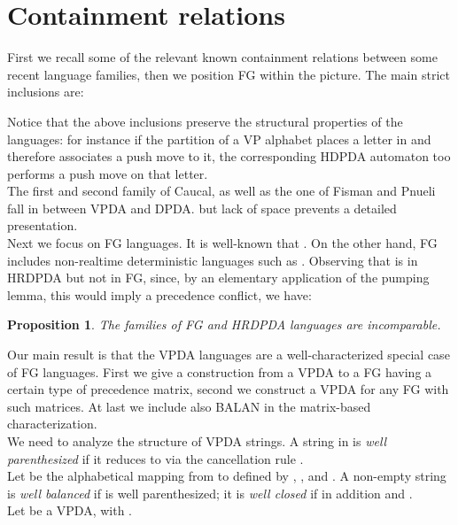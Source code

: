 \documentclass[3p,11pt]{elsarticle}
\newtheorem{proposition}[theorem]{Proposition}
\begin{document}
\section{Containment relations}
First we recall some of the relevant known \cite{AluMad04,conf/mfcs/NowotkaS07,conf/csr/LimayeMM08,caucal:DSP:2008:1743} containment relations between some recent language families, then we position FG within the picture. The main  strict inclusions are:
\begin{center}

\end{center}
Notice that the above inclusions preserve the structural properties of the languages: for instance if the partition of a VP alphabet places a letter in  and therefore associates a push move to it, the corresponding HDPDA automaton too performs a push move on that letter.
\\
The first \cite{conf/dlt/Caucal06} and second \cite{conf/csr/CaucalH08} family of Caucal, as well as the one of Fisman and Pnueli \cite{FisPnu01} fall in between VPDA and DPDA. but lack of space prevents a detailed presentation.
\\
\label{SectVPAareOPG} Next we focus on FG  languages. It is well-known that . On the other hand, FG includes non-realtime deterministic languages such as . Observing that  is in HRDPDA but not in FG, since, by an elementary application of the pumping lemma, this would imply a precedence conflict, we have:
 \begin{proposition}
 The families of FG and HRDPDA languages are incomparable.
 \end{proposition}
 Our main result is that the VPDA languages are a well-characterized special case of
 FG languages. First we give a construction from a VPDA to a FG having a
 certain type of precedence matrix, second we construct a VPDA for any FG with such matrices.
At last we include also BALAN in the matrix-based characterization.
\\
 We need to analyze the structure of  VPDA strings.
 A string in  is \emph{well parenthesized} if it reduces to  via the cancellation rule .
\\
Let  be the alphabetical mapping from  to  defined by , , and . A non-empty string  is \emph{well balanced} if   is well parenthesized; it is \emph{well closed} if in addition  and .
\\
Let  be a VPDA, with .
\end{document}
